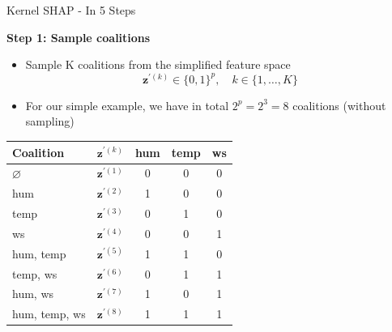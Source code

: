 \documentclass[11pt,compress,t,notes=noshow, aspectratio=169, xcolor=table]{beamer}
\begin{document}
\begin{frame}{Kernel SHAP - In 5 Steps}


\textbf{Step 1: Sample coalitions}
\begin{itemize}
    \item Sample K coalitions from the simplified feature space
    $$\mathbf{z}^{\prime (k)} \in\{0,1\}^{p}, \quad k \in\{1, \ldots, K\}$$
    \item For our simple example, we have in total $2^p = 2^3 = 8$ coalitions (without sampling)
\end{itemize}

\begin{table}[]
    \centering
     \begin{tabular}{l |c|ccc}
  Coalition  & $\mathbf{z}^{\prime (k)}$ &  hum & temp & ws \\
  \hline 
  $\varnothing$ & $\mathbf{z}^{\prime (1)}$ & 0 & 0 & 0  \\
  hum & $\mathbf{z}^{\prime (2)}$ & 1 & 0 & 0  \\
  temp &  $\mathbf{z}^{\prime (3)}$ & 0 & 1 & 0  \\
  ws &   $\mathbf{z}^{\prime (4)}$ & 0 & 0 & 1  \\
  hum, temp & $\mathbf{z}^{\prime (5)}$ & 1 & 1 & 0  \\
  temp, ws & $\mathbf{z}^{\prime (6)}$ & 0 & 1 & 1  \\
  hum, ws &   $\mathbf{z}^{\prime (7)}$ & 1 & 0 & 1  \\
  hum, temp, ws & $\mathbf{z}^{\prime (8)}$ & 1 & 1 & 1  \\
  
 
  \end{tabular}
\end{table}

\end{frame}
\end{document}
